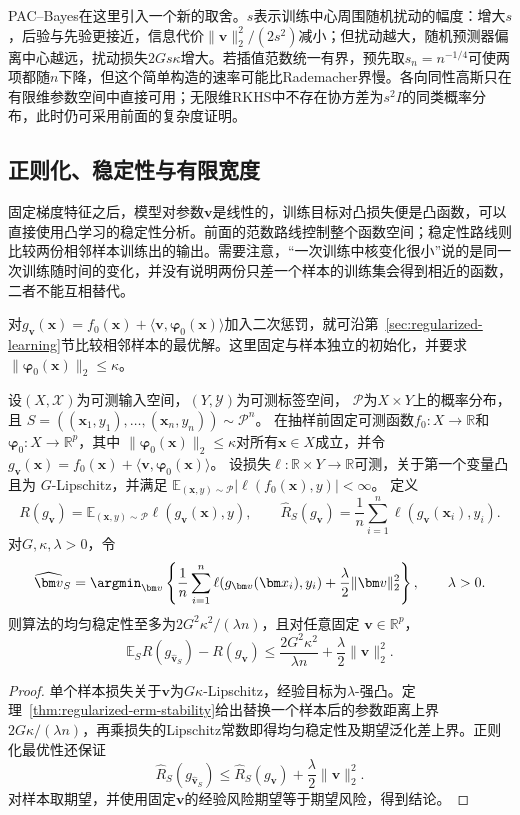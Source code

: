 PAC--Bayes在这里引入一个新的取舍。$s$表示训练中心周围随机扰动的幅度：增大$s$，后验与先验更接近，信息代价$\|\widehat{\bm v}\|_2^2/(2s^2)$减小；但扰动越大，随机预测器偏离中心越远，扰动损失$2Gs\kappa$增大。若插值范数统一有界，预先取$s_n=n^{-1/4}$可使两项都随$n$下降，但这个简单构造的速率可能比Rademacher界慢。各向同性高斯只在有限维参数空间中直接可用；无限维RKHS中不存在协方差为$s^2I$的同类概率分布，此时仍可采用前面的复杂度证明。

\subsection{正则化、稳定性与有限宽度}

固定梯度特征之后，模型对参数$\bm v$是线性的，训练目标对凸损失便是凸函数，可以直接使用凸学习的稳定性分析。前面的范数路线控制整个函数空间；稳定性路线则比较两份相邻样本训练出的输出。需要注意，“一次训练中核变化很小”说的是同一次训练随时间的变化，并没有说明两份只差一个样本的训练集会得到相近的函数，二者不能互相替代。

对$g_{\bm v}(\bm x)=f_0(\bm x)+\langle\bm v,\bm\varphi_0(\bm x)\rangle$加入二次惩罚，就可沿第~\ref{sec:regularized-learning}节比较相邻样本的最优解。这里固定与样本独立的初始化，并要求$\|\bm\varphi_0(\bm x)\|_2\leq\kappa$。

\begin{theorem}[正则化固定特征模型的稳定性]
\label{thm:ntk-stability-risk}
设$(X,\mathcal X)$为可测输入空间，$(Y,\mathcal Y)$为可测标签空间，
$\mathcal P$为$X\times Y$上的概率分布，且
$S=((\bm x_1,y_1),\ldots,(\bm x_n,y_n))\sim\mathcal P^n$。
在抽样前固定可测函数$f_0:X\to\mathbb R$和
$\bm\varphi_0:X\to\mathbb R^p$，其中
$\|\bm\varphi_0(\bm x)\|_2\leq\kappa$对所有$\bm x\in X$成立，并令
$g_{\bm v}(\bm x)=f_0(\bm x)+\langle\bm v,\bm\varphi_0(\bm x)\rangle$。
设损失$\ell:\mathbb R\times Y\to\mathbb R$可测，关于第一个变量凸且为
$G$-Lipschitz，并满足
$\mathbb E_{(\bm x,y)\sim\mathcal P}|\ell(f_0(\bm x),y)|<\infty$。
定义
\[
 R(g_{\bm v})=\mathbb E_{(\bm x,y)\sim\mathcal P}
                    \ell(g_{\bm v}(\bm x),y),\qquad
 \hat R_S(g_{\bm v})=\frac1n\sum_{i=1}^n
                    \ell(g_{\bm v}(\bm x_i),y_i).
\]
对$G,\kappa,\lambda>0$，令
\[
 \widehat{\bm v}_S=\argmin_{\bm v}
 \left\{\frac1n\sum_{i=1}^n\ell(g_{\bm v}(\bm x_i),y_i)
       +\frac\lambda2\|\bm v\|_2^2\right\},\qquad\lambda>0.
\]
则算法的均匀稳定性至多为$2G^2\kappa^2/(\lambda n)$，且对任意固定
$\bm v\in\mathbb R^p$，
\[
 \mathbb E_S R(g_{\widehat{\bm v}_S})-R(g_{\bm v})
 \leq\frac{2G^2\kappa^2}{\lambda n}+\frac\lambda2\|\bm v\|_2^2.
\]
\end{theorem}
\begin{proof}
单个样本损失关于$\bm v$为$G\kappa$-Lipschitz，经验目标为$\lambda$-强凸。定理~\ref{thm:regularized-erm-stability}给出替换一个样本后的参数距离上界$2G\kappa/(\lambda n)$，再乘损失的Lipschitz常数即得均匀稳定性及期望泛化差上界。正则化最优性还保证
\[
 \hat R_S(g_{\widehat{\bm v}_S})
 \leq\hat R_S(g_{\bm v})+\frac\lambda2\|\bm v\|_2^2.
\]
对样本取期望，并使用固定$\bm v$的经验风险期望等于期望风险，得到结论。
\end{proof}

